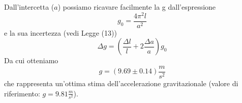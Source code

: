 \documentclass[11pt]{article}
\begin{document}
Dall'intercetta ($a$) possiamo ricavare facilmente la g dall'espressione
\begin{equation}
    g_0=\frac{4\pi^2 l}{a^2}
\end{equation}
e la sua incertezza (vedi Legge (13))
\begin{equation}
    \Delta g = \left(\frac{\Delta l}{l} + 2\frac{\Delta a}{a}\right)g_0
\end{equation}
Da cui otteniamo
\begin{equation}
    g = (9.69\pm 0.14) \frac{m}{s^2}
\end{equation}
che rappresenta un'ottima stima dell'accelerazione gravitazionale (valore di riferimento: $g=9.81\frac{m}{s^2}$).
\end{document}
